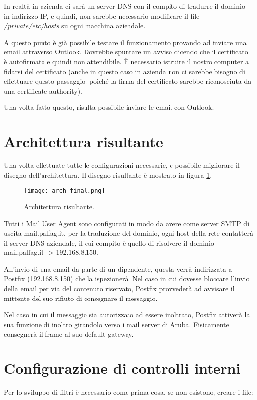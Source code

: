     
    In realtà in azienda ci sarà un server DNS con il compito di tradurre il dominio in indirizzo IP, 
    e quindi, non sarebbe necessario modificare il file \textit{/private/etc/hosts} su ogni macchina aziendale.


    A questo punto è già possibile testare il funzionamento provando ad inviare una email attraverso Outlook. 
    Dovrebbe spuntare un avviso dicendo che il certificato è autofirmato e quindi non attendibile. 
    È necessario istruire il nostro computer a fidarsi del certificato
    (anche in questo caso in azienda non ci sarebbe bisogno di effettuare questo passaggio, poiché 
    la firma del certificato sarebbe riconosciuta da una certificate authority).

    Una volta fatto questo, risulta possibile inviare le email con Outlook.


    \section{Architettura risultante}
    Una volta effettuate tutte le configurazioni necessarie, è possibile migliorare il disegno dell’architettura. 
    Il disegno risultante è mostrato in figura \ref{archFinal}.

    \begin{figure}[htp]
        \centering
        \texttt{[image: arch\_final.png]}
        \caption{Architettura risultante.}\label{archFinal}
    \end{figure} 

    Tutti i Mail User Agent sono configurati in modo da avere come server SMTP di uscita mail.palfag.it, 
    per la traduzione del dominio, ogni host della rete contatterà il server DNS aziendale, il cui compito è
    quello di risolvere il dominio mail.palfag.it -> 192.168.8.150.

    All'invio di una email da parte di un dipendente, questa verrà indirizzata a Postfix (192.168.8.150) che la 
    ispezionerà. Nel caso in cui dovesse bloccare l’invio della email per via del contenuto riservato, 
    Postfix provvederà ad avvisare il mittente del suo rifiuto di consegnare il messaggio.

    Nel caso in cui il messaggio sia autorizzato ad essere inoltrato, Postfix attiverà la sua funzione di inoltro 
    girandolo verso i mail server di Aruba. Fisicamente consegnerà il frame al suo default gateway.

    \section{Configurazione di controlli interni}
    Per lo sviluppo di filtri è necessario come prima cosa, se non esistono, creare i file:

